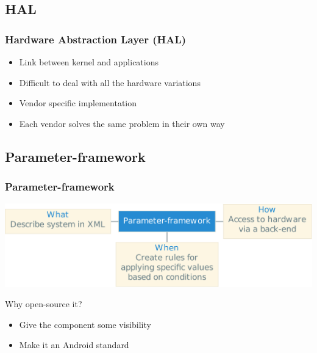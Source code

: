 \subsection{HAL}
\begin{frame}
    \frametitle{Hardware Abstraction Layer (HAL)}
    \begin{itemize}
        \item Link between kernel and applications
        \item Difficult to deal with all the hardware variations
        \item Vendor specific implementation
        \item Each vendor solves the same problem in their own way
    \end{itemize}
\end{frame}

\subsection{Parameter-framework}
\begin{frame}
    \frametitle{Parameter-framework}
    \includegraphics[width=\textwidth]{./img/pfwContext.pdf}
    \begin{block}{Why open-source it?}
        \begin{itemize}
            \item Give the component some visibility
            \item Make it an Android standard
        \end{itemize}
    \end{block}
\end{frame}
